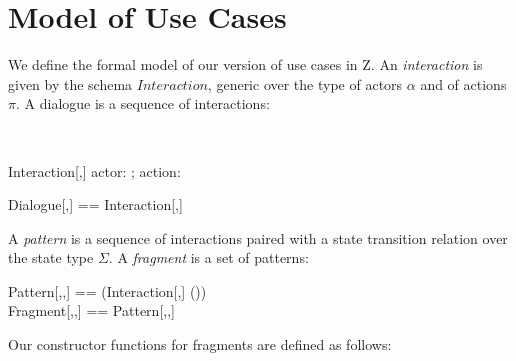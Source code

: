 \section{Model of Use Cases}

We define the formal model of our version of use cases in Z. An
\emph{interaction} is given by the schema $Interaction$, generic over
the type of actors $\alpha$ and of actions $\pi$.  A dialogue is
a sequence of interactions:

\begin{zedgroup}
\begin{zdirectives}
\end{zdirectives} \\
\begin{schema}{Interaction[\alpha,\pi]}
  actor: \alpha; action: \pi
\end{schema}
\begin{zed}
  Dialogue[\alpha,\pi] == \seq Interaction[\alpha,\pi] 
\end{zed}
\end{zedgroup}

A \emph{pattern} is a sequence of interactions paired with a state
transition relation over the state type $\Sigma$. A \emph{fragment}
is a set of patterns:
\begin{zedgroup}
\begin{zed}
  Pattern[\alpha,\pi,\Sigma] == 
    \seq (Interaction[\alpha,\pi] \cross (\Sigma \rel \Sigma)) \\
  Fragment[\alpha,\pi,\Sigma] == 
    \power Pattern[\alpha,\pi,\Sigma]
\end{zed}
\end{zedgroup}

Our constructor functions for fragments are defined as follows:

